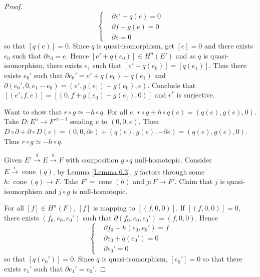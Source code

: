 \documentclass{ctexart}
\newcommand{\cone}{\operatorname{cone}}
\begin{document}
\begin{proof}
\begin{equation}
        \left\{
            \begin{aligned}
                & \partial e' + q(e) = 0 \\
                & \partial f + g(e) = 0 \\
                & \partial e = 0
            \end{aligned}
        \right.
    \end{equation}
    so that $[q(e)] = 0$.
    Since $q$ is quasi-isomorphism, get $[e] = 0$ and there exists $e_{0}$ such that $\partial e_{0} = e$.
    Hence $[e' + q(e_{0})]\in H^{n}(E')$ and as $q$ is quasi-isomorphism, there exists $e_{1}$ such that $[e' + q(e_{0})] = [q(e_{1})]$.
    Thus there exists $e_{0}'$ such that $\partial e_{0}' = e' + q(e_{0}) - q(e_{1})$ and $\partial (e_{0}', 0, e_{1} - e_{0}) = (e', g(e_{1}) - g(e_{0}), e)$.
    Conclude that $[(e', f, e)] = [(0, f + g(e_{0}) - g(e_{1}), 0)]$ and $r^{\ast}$ is surjective.
    \par
    Want to show that $r \circ g \simeq -h \circ q$.
    For all $e$, $r \circ g + h \circ q(e) = (q(e), g(e), 0)$.
    Take $D: E^{n} \rightarrow {F'}^{n - 1}$ sending $e$ to $(0, 0, e)$.
    Then $D \circ \partial + \partial \circ D(e) = (0, 0, \partial e) + (q(e), g(e), -\partial e) = (q(e), g(e), 0)$.
    Thus $r \circ g \simeq -h \circ q$.
    \par
    Given $E' \overset{q}{\rightarrow} E \overset{g}{\rightarrow} F$ with composition $g \circ q$ null-homotopic.
    Consider $E \overset{i}{\rightarrow} \cone (q)$, by Lemma \ref{Lemma 6.3}, $g$ factors through some $h: \cone (q) \rightarrow F$.
    Take $F' = \cone (h)$ and $j: F \rightarrow F'$.
    Claim that $j$ is quasi-isomorphism and $j \circ g$ is null-homotopic.
    \par
    For all $[f]\in H^{n}(F)$, $[f]$ is mapping to $[(f, 0, 0)]$.
    If $[(f, 0, 0)] = 0$, there exists $(f_{0}, e_{0}, e_{0}')$ such that $\partial (f_{0}, e_{0}, e_{0}') = (f, 0, 0)$.
    Hence
    \begin{equation}
        \left\{
            \begin{aligned}
                & \partial f_{0} + h(e_{0}, e_{0}') = f \\
                & \partial e_{0} + q(e_{0}') = 0 \\
                & \partial e_{0}' = 0
            \end{aligned}
        \right.
    \end{equation}
    so that $[q(e_{0}')] = 0$.
    Since $q$ is quasi-isomorphism, $[e_{0}'] = 0$ so that there exists $e_{1}'$ such that $\partial e_{1}' = e_{0}'$.

\end{proof}
\end{document}
